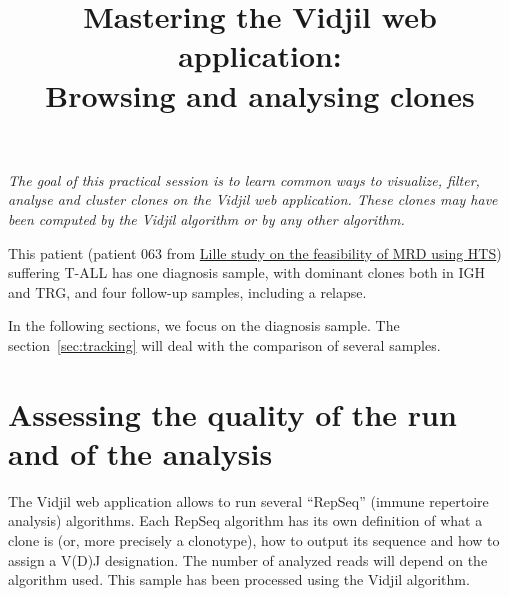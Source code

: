 \documentclass[10pt]{article}
\title{Mastering the Vidjil web application:\\ Browsing and analysing clones
}
\begin{document}
\maketitle

\textit{The goal of this practical session is to learn
common ways to visualize, filter, analyse and cluster clones
on the Vidjil web application.
%
These clones may have been computed by the Vidjil algorithm
or by any other algorithm.}

\bigskip


This patient (patient 063 from \href{http://dx.doi.org/10.1016/j.leukres.2016.11com.009}{Lille study on the feasibility of MRD using HTS}) suffering T-ALL has one diagnosis sample,
with dominant clones both in IGH and TRG,
and four follow-up samples, including a relapse.


In the following sections, we focus on the diagnosis sample.
The section~\ref{sec:tracking} will deal with the comparison of several samples. 

\section{Assessing the quality of the run and of the analysis}
The Vidjil web application allows to run several ``RepSeq'' (immune repertoire analysis) algorithms.
Each RepSeq algorithm has its own definition of what a clone is (or, more precisely
a clonotype), how to output its sequence and how to assign a V(D)J designation.
The number of analyzed reads will depend on the algorithm used.
This sample has been processed using the Vidjil algorithm.


\end{document}
